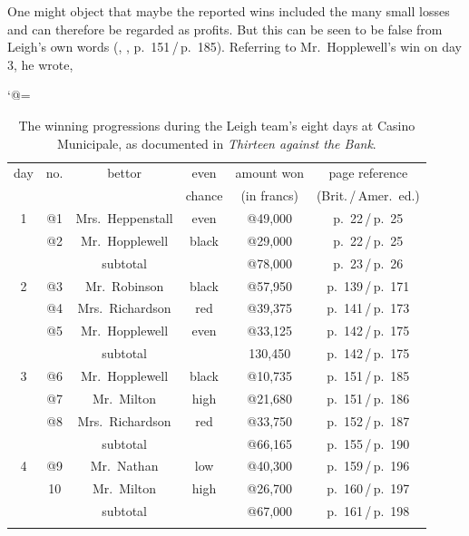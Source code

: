 \documentclass{article}
\theoremstyle{definition}
\theoremstyle{remark}
\begin{document}
One might object that maybe the reported wins included the many small losses and can therefore be regarded as profits.  But this can be seen to be false from Leigh's own words (\citeauthor{L76}, \citeyear{L76}, p.~151\,/\,p.~185).  Referring to Mr.~Hopplewell's win on day 3, he wrote,



\begin{table}[H]
\caption{The winning progressions during the Leigh team's eight days at Casino Municipale, as documented in \textit{Thirteen against the Bank}.\label{tab:Leigh-data}}
\catcode`@=\active{}
\begin{center}
\begin{tabular}{cccccc}
day & no. & bettor & even   & amount won & page reference \\
    &  &        & chance & (in francs)  & (Brit.\,/\,Amer.~ed.) \\
\noalign{\smallskip}\hline\noalign{\smallskip}
1 & @1 & Mrs.\ Heppenstall & even & @49,000 & p.~22\,/\,p.~25 \\
  & @2 & Mr.\ Hopplewell   & black & @29,000 & p.~22\,/\,p.~25 \\
  & & subtotal           &       & @78,000 & p.~23\,/\,p.~26 \\
\noalign{\smallskip}\hline\noalign{\smallskip}
2 & @3 & Mr.\ Robinson & black & @57,950 & p.~139\,/\,p.~171 \\
  & @4 & Mrs.\ Richardson & red & @39,375 & p.~141\,/\,p.~173 \\
  & @5 & Mr.\ Hopplewell & even & @33,125 & p.~142\,/\,p.~175 \\
  & & subtotal         &      & 130,450 & p.~142\,/\,p.~175 \\
\noalign{\smallskip}\hline\noalign{\smallskip}
3 & @6 & Mr.\ Hopplewell &  black & @10,735 & p.~151\,/\,p.~185 \\
  & @7 & Mr.\ Milton & high & @21,680 & p.~151\,/\,p.~186 \\
  & @8 & Mrs.\ Richardson & red & @33,750 & p.~152\,/\,p.~187 \\
  & & subtotal & & @66,165 & p.~155\,/\,p.~190 \\
\noalign{\smallskip}\hline\noalign{\smallskip}
4 & @9 & Mr.\ Nathan & low & @40,300 & p.~159\,/\,p.~196 \\
  & 10 & Mr.\ Milton & high & @26,700 & p.~160\,/\,p.~197 \\
  & & subtotal & & @67,000 & p.~161\,/\,p.~198 \\
\noalign{\smallskip}\hline\noalign{\smallskip} 

\end{tabular}
\end{center}
\end{table}
\end{document}
